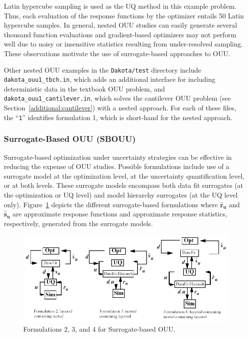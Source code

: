 Latin hypercube sampling is used as the UQ method in this example
problem. Thus, each evaluation of the response functions by the
optimizer entails 50 Latin hypercube samples. In general, nested OUU
studies can easily generate several thousand function evaluations and
gradient-based optimizers may not perform well due to noisy or
insensitive statistics resulting from under-resolved sampling. These
observations motivate the use of surrogate-based approaches to OUU.

Other nested OUU examples in the \texttt{Dakota/test} directory
include \texttt{dakota\_ouu1\_tbch.in}, which adds an additional
interface for including deterministic data in the textbook OUU
problem, and\\ \texttt{dakota\_ouu1\_cantilever.in}, which solves the
cantilever OUU problem (see Section~\ref{additional:cantilever}) with
a nested approach. For each of these files, the ``\texttt{1}''
identifies formulation 1, which is short-hand for the nested approach.

\subsubsection{Surrogate-Based OUU (SBOUU)}\label{models:ex:ouu:sb}

Surrogate-based optimization under uncertainty strategies can be
effective in reducing the expense of OUU studies. Possible
formulations include use of a surrogate model at the optimization
level, at the uncertainty quantification level, or at both levels.
These surrogate models encompass both data fit surrogates (at the
optimization or UQ level) and model hierarchy surrogates (at the UQ
level only). Figure~\ref{models:ex:figure10} depicts the different
surrogate-based formulations where $\mathbf{\hat{r}_{u}}$ and
$\mathbf{\hat{s}_{u}}$ are approximate response functions and
approximate response statistics, respectively, generated from the
surrogate models.

\begin{figure}
  \centering
  \includegraphics[scale=0.65]{images/sbouu}
  \caption{Formulations 2, 3, and 4 for Surrogate-based OUU.}
  \label{models:ex:figure10}
\end{figure}


